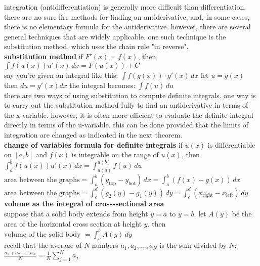 \documentclass{article}
\begin{document}
integration (antidifferentiation) is generally more difficult than differentiation. there are no sure-fire methods for finding an antiderivative, and, in some cases, there is no elementary formula for the antiderivative. however, there are several general techniques that are widely applicable. one such technique is the substitution method, which uses the chain rule "in reverse".\\

\textbf{substitution method} if $F'(x) = f(x)$, then\\
$\int f(u(x))u'(x)\,dx = F(u(x)) + C$\\

say you're given an integral like this: $\int f(g(x)) \cdot g'(x)\,dx$ let $u = g(x)$ then $du = g'(x)dx$ the integral becomes: $\int f(u)\,du$\\

there are two ways of using substitution to compute definite integrals. one way is to carry out the substitution method fully to find an antiderivative in terms of the x-variable. however, it is often more efficient to evaluate the definite integral directly in terms of the u-variable. this can be done provided that the limits of integration are changed as indicated in the next theorem.\\

\textbf{change of variables formula for definite integrals} if $u(x)$ is differentiable on $[a, b]$ and $f(x)$ is integrable on the range of $u(x)$, then\\
$\int_{a}^{b}f(u(x))u'(x)\,dx = \int_{u(a)}^{u(b)}f(u)\,du$\\

$\text{area between the graphs} = \int_{a}^{b}(y_{\text{top}} - y_{\text{bot}})\,dx = \int_{a}^{b}(f(x) - g(x))\,dx$\\

$\text{area between the graphs} = \int_{c}^{d}(g_2(y) - g_1(y))\,dy = \int_{c}^{d}(x_{\text{right}} - x_{\text{left}})\,dy$\\

\textbf{volume as the integral of cross-sectional area}\\
suppose that a solid body extends from height $y = a$ to $y = b$. let $A(y)$ be the area of the horizontal cross section at height $y$. then\\ $\text{volume of the solid body } = \int_{a}^{b}A(y)\,dy$\\

recall that the average of $N$ numbers $a_1, a_2, \ldots, a_N$ is the sum divided by $N$:\\ $\frac{a_1 + a_2 + \ldots a_N}{N} = \frac{1}{N}\sum_{j=1}^{N}a_j$\\ 
\end{document}
